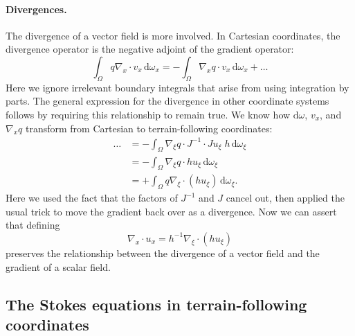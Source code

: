 \documentclass[gmd, manuscript]{copernicus}
\begin{document}
\paragraph{Divergences.}
The divergence of a vector field is more involved.
In Cartesian coordinates, the divergence operator is the negative adjoint of the gradient operator:
\begin{equation}
    \int_\Omega q\nabla_x \cdot v_x\,\mathrm d\omega_x = -\int_\Omega\nabla_x q\cdot v_x\,\mathrm d\omega_x + \ldots
\end{equation}
Here we ignore irrelevant boundary integrals that arise from using integration by parts.
The general expression for the divergence in other coordinate systems follows by requiring this relationship to remain true.
We know how $\mathrm d\omega$, $v_x$, and $\nabla_x q$ transform from Cartesian to terrain-following coordinates:
\begin{align}
    \ldots & = -\int_\Omega\nabla_\xi q\cdot J^{-1}\cdot Ju_\xi\;h\,\mathrm{d}\omega_\xi \nonumber\\
    & = -\int_\Omega\nabla_\xi q\cdot h u_\xi\,\mathrm{d}\omega_\xi \nonumber\\
    & = +\int_\Omega q\nabla_\xi\cdot(hu_\xi)\,\mathrm{d}\omega_\xi.
\end{align}
Here we used the fact that the factors of $J^{-1}$ and $J$ cancel out, then applied the usual trick to move the gradient back over as a divergence.
Now we can assert that defining
\begin{equation}
    \nabla_x\cdot u_x = h^{-1}\nabla_\xi\cdot (hu_\xi)
    \label{eq:xform-divergence}
\end{equation}
preserves the relationship between the divergence of a vector field and the gradient of a scalar field.


\subsection{The Stokes equations in terrain-following coordinates}
\end{document}
